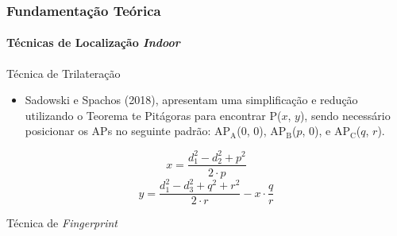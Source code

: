 \documentclass[xcolor={dvipsnames,svgnames,table}]{beamer}
\begin{document}
	\begin{frame}
		\frametitle{Fundamentação Teórica}
		\framesubtitle{Técnicas de Localização \textit{Indoor}}
		\begin{block}{Técnica de Trilateração}
			\begin{itemize}[label=\textcolor{black}{\textbullet}, left=5pt]
				\justifying
				\item Sadowski e Spachos (2018), apresentam uma simplificação e redução utilizando o Teorema te Pitágoras para encontrar P($x$, $y$), sendo necessário posicionar os APs no seguinte padrão: AP$_\text{A}$($0$, $0$), AP$_\text{B}$($p$, $0$), e AP$_\text{C}$($q$, $r$). %
			\end{itemize}
			\begin{equation}
				\label{equacoes-simplificada-trilateracao-x}
				x = \frac{d_1^2-d_2^2+p^2}{2\cdot p}
			\end{equation}
			\begin{equation}
				\label{equacoes-simplificada-trilateracao-y}
				y = \frac{d_1^2-d_3^2+q^2+r^2}{2\cdot r} - x\cdot\frac{q}{r}
			\end{equation}		
		\end{block}
		\begin{block}{Técnica de \textit{Fingerprint}}
			\begin{itemize}[label=\textcolor{black}{\textbullet}, left=5pt]
				\justifying

\end{itemize}
\end{block}
\end{frame}
\end{document}
